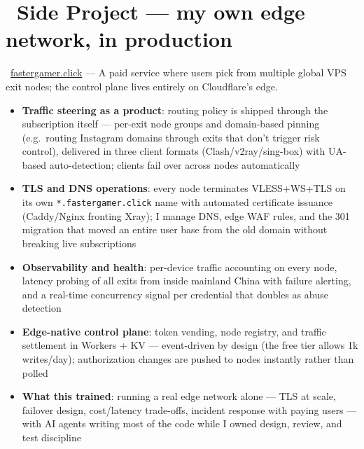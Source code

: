 \documentclass{resume}
\begin{document}
\section{\faLightbulbO\ Side Project --- my own edge network, in production}
\begin{singlespacing}
\faGlobe\ \href{https://fastergamer.click}{fastergamer.click} ---
A paid service where users pick from multiple global VPS exit nodes; the control plane lives entirely on Cloudflare's edge.
\begin{itemize}
	\item \textbf{Traffic steering as a product}: routing policy is shipped through the subscription itself --- per-exit node groups and domain-based pinning (e.g.\ routing Instagram domains through exits that don't trigger risk control), delivered in three client formats (Clash/v2ray/sing-box) with UA-based auto-detection; clients fail over across nodes automatically
	\item \textbf{TLS and DNS operations}: every node terminates VLESS+WS+TLS on its own \texttt{*.fastergamer.click} name with automated certificate issuance (Caddy/Nginx fronting Xray); I manage DNS, edge WAF rules, and the 301 migration that moved an entire user base from the old domain without breaking live subscriptions
	\item \textbf{Observability and health}: per-device traffic accounting on every node, latency probing of all exits from inside mainland China with failure alerting, and a real-time concurrency signal per credential that doubles as abuse detection
	\item \textbf{Edge-native control plane}: token vending, node registry, and traffic settlement in Workers + KV --- event-driven by design (the free tier allows 1k writes/day); authorization changes are pushed to nodes instantly rather than polled
	\item \textbf{What this trained}: running a real edge network alone --- TLS at scale, failover design, cost/latency trade-offs, incident response with paying users --- with AI agents writing most of the code while I owned design, review, and test discipline
\end{itemize}
\end{singlespacing}
\end{document}
